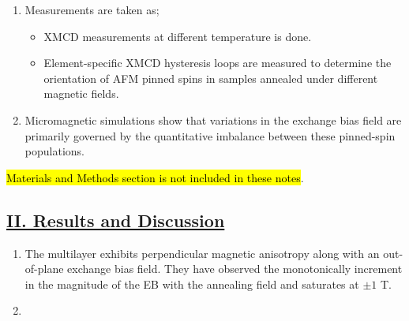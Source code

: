\begin{enumerate}
    \item Measurements are taken as;
    \begin{itemize}
        \item XMCD measurements at different temperature is done.
        \item Element-specific XMCD hysteresis loops are measured to determine the orientation of AFM pinned spins in samples annealed under different magnetic fields.
    \end{itemize}
    \item Micromagnetic simulations show that variations in the exchange bias field are primarily governed by the quantitative imbalance between these pinned-spin populations.
\end{enumerate}

 \hl{Materials and Methods section is not included in these notes}.
\subsection*{\centering\underline{II. Results and Discussion}}
\begin{enumerate}
    \item The multilayer exhibits perpendicular magnetic anisotropy along with an out-of-plane exchange bias field. They have observed the monotonically increment in the magnitude of the EB with the annealing field and saturates at $\pm1$ T.
    \item 
\end{enumerate}
